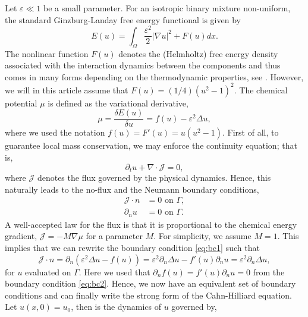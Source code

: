 \documentclass[11pt]{article}
\theoremstyle{remark}
\newcommand{\abs}[1]{\left\lvert #1 \right\rvert}
\numberwithin{equation}{section}
\begin{document}
Let $\varepsilon \ll 1 $ be a small parameter. For an isotropic
binary mixture non-uniform, the standard Ginzburg-Landay free energy functional is given by
\begin{equation}
E( u)  = \int_{\Omega }^{} \frac{\varepsilon^2 }{2} \abs{ \nabla u } ^2 +  F( u) dx.
\end{equation}
The nonlinear function $F( u) $ denotes the (Helmholtz) free energy density associated with the interaction dynamics between the components and thus comes in many forms depending on the thermodynamic properties, see \cite{miranville2017cahn}.
However, we will in this article assume that $F( u) = ( 1 / 4 ) ( u^2 -1 ) ^{2} $.
The chemical potential $\mu $ is defined as the variational derivative,
\begin{equation}
\mu = \frac{ \delta E( u) }{ \delta  u} = f( u)  - \varepsilon^2  \Delta u ,
\end{equation}
where we used the notation $f( u) = F'( u) =u( u^2 -1)  $.
First of all, to guarantee local mass conservation, we may enforce the continuity equation; that is,
\begin{equation}
    \partial _{t} u + \nabla \cdot \mathcal{J}  = 0,
\end{equation}
where $\mathcal{J} $ denotes the flux governed by the physical dynamics. Hence, this naturally leads to the no-flux and the Neumann boundary conditions,
\begin{align}
\label{eq:bc1}
\mathcal{J}  \cdot n & = 0 \text{ on } \Gamma, \\
\label{eq:bc2}
\partial _{n} u & = 0 \text{ on } \Gamma.
\end{align}
 A well-accepted law for the flux is that it is proportional to the chemical energy gradient, $\mathcal{J} = - M  \nabla \mu  $ for a parameter $M$. For simplicity, we assume $M=1$. This implies that we can rewrite the boundary condition
 \eqref{eq:bc1} such that
 \begin{equation}
     \mathcal{J}  \cdot n  = \partial _{n} \left(  \varepsilon^2 \Delta u - f( u)   \right)  = \varepsilon^2  \partial _{n} \Delta u -  f' ( u) \partial _{n}u =  \varepsilon^2  \partial _{n} \Delta u    ,
 \end{equation}
 for $u$ evaluated on $\Gamma $. Here we used that $\partial _{n} f( u) = f' ( u) \partial _{n}u  = 0$ from the boundary condition \eqref{eq:bc2}.
 Hence, we now have an equivalent set of boundary conditions and can finally write the strong form of the Cahn-Hilliard equation. Let $ u( x,0) =  u_{0}$, then is the dynamics of $u$ governed by,
\end{document}
